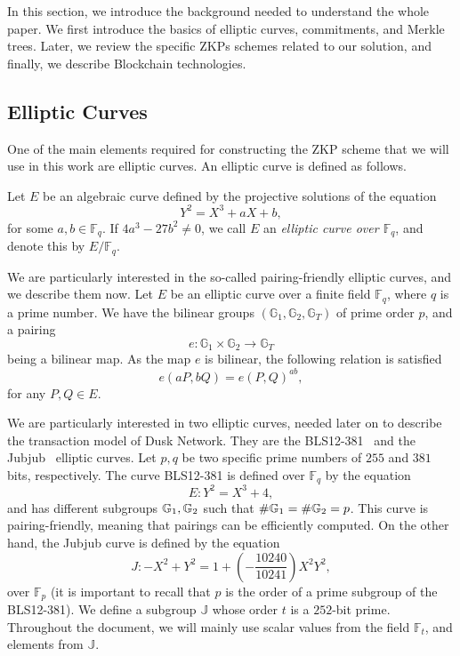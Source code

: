 In this section, we introduce the background needed to understand the whole paper. We first introduce the basics of elliptic curves, commitments, and Merkle trees. Later, we review the specific ZKPs schemes related to our solution, and finally, we describe Blockchain technologies.

\subsection{Elliptic Curves}

One of the main elements required for constructing the ZKP scheme that we will use in this work are elliptic curves. An elliptic curve is defined as follows.

\begin{definition}
    Let $E$ be an algebraic curve defined by the projective solutions of the equation 
    \[Y^2=X^3+aX+b,\] 
    for some $a,b\in\mathbb{F}_{q}$. If $4a^3-27b^2\neq 0$, we call $E$ an \emph{elliptic curve over $\mathbb{F}_{q}$}, and denote this by $E/\mathbb{F}_{q}$.
\end{definition}


We are particularly interested in the so-called pairing-friendly elliptic curves, and we describe them now. Let $E$ be an elliptic curve over a finite field $\mathbb{F}_q$, where $q$ is a prime number. We have the bilinear groups $(\mathbb{G}_1, \mathbb{G}_2, \mathbb{G}_T)$ of prime order $p$, and a pairing 
\[e : \mathbb{G}_1 \times \mathbb{G}_2 \rightarrow \mathbb{G}_T\]
being a bilinear map. As the map $e$ is bilinear, the following relation is satisfied 
\[e(aP,bQ)=e(P,Q)^{ab},\]
for any $P,Q\in E$.

We are particularly interested in two elliptic curves, needed later on to describe the transaction model of Dusk Network. They are the BLS12-381~\cite{zcashBLS} and the Jubjub~\cite{zcashJubJub} elliptic curves. Let $p, q$ be two specific prime numbers of $255$ and $381$ bits, respectively.
The curve BLS12-381 is defined over $\mathbb{F}_q$ by the equation
\[E: Y^2 = X^3 + 4,\]
and has different subgroups $\mathbb{G}_1, \mathbb{G}_2$ such that $\#\mathbb{G}_1 = \#\mathbb{G}_2 = p$. This curve is pairing-friendly, meaning that pairings can be efficiently computed. On the other hand, the Jubjub curve is defined by the equation
\[J : -X^2+Y^2 = 1 + \left(-\frac{10240}{10241}\right)X^2Y^2,\]
over $\mathbb{F}_p$ (it is important to recall that $p$ is the order of a prime subgroup of the BLS12-381). We define a subgroup $\mathbb{J}$ whose order $t$ is a $252$-bit prime. Throughout the document, we will mainly use scalar values from the field $\mathbb{F}_t$, and elements from $\mathbb{J}$.

